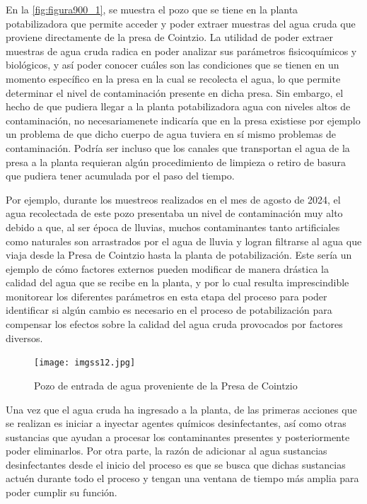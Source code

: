 En la \autoref{fig:figura900_1}, se muestra el pozo que se tiene en la planta potabilizadora que permite acceder y poder extraer muestras del agua cruda que proviene 
directamente de la presa de Cointzio. La utilidad de poder extraer muestras de agua cruda radica en poder analizar sus parámetros fisicoquímicos y biológicos, y así 
poder conocer cuáles son las condiciones que se tienen en un momento específico en la presa en la cual se recolecta el agua, lo que permite determinar el nivel de 
contaminación presente en dicha presa. Sin embargo, el hecho de que pudiera llegar a la planta potabilizadora agua con niveles altos de contaminación, 
no necesariamenete indicaría que en la presa existiese por ejemplo un problema de que dicho cuerpo de agua tuviera en sí mismo problemas de contaminación. Podría ser 
incluso que los canales que transportan el agua de la presa a la planta requieran algún procedimiento de limpieza o retiro de basura que pudiera tener acumulada por el paso del tiempo.

Por ejemplo, durante los muestreos realizados en el mes de agosto de 2024, el agua recolectada de este pozo presentaba un nivel de contaminación muy alto debido a que, al ser época de lluvias, muchos contaminantes tanto 
artificiales como naturales son arrastrados por el agua de lluvia y logran filtrarse al agua que viaja desde la Presa de Cointzio hasta la planta de potabilización. Este sería un ejemplo de cómo factores externos pueden 
modificar de manera drástica la calidad del agua que se recibe en la planta, y por lo cual resulta imprescindible monitorear los diferentes parámetros en esta etapa del proceso para poder identificar si algún cambio es necesario 
en el proceso de potabilización para compensar los efectos sobre la calidad del agua cruda provocados por factores diversos.  

\clearpage

\begin{figure}[h]
	\centering
	\texttt{[image: imgss12.jpg]}
	\caption{Pozo de entrada de agua proveniente de la Presa de Cointzio}
	\label{fig:figura900_1}
\end{figure}

Una vez que el agua cruda ha ingresado a la planta, de las primeras acciones que se realizan es iniciar a inyectar agentes químicos desinfectantes, así como otras sustancias que ayudan a procesar los contaminantes presentes y 
posteriormente poder eliminarlos. Por otra parte, la razón de adicionar al agua sustancias desinfectantes desde el inicio del proceso es que se busca que dichas sustancias actuén durante todo el proceso y tengan una ventana de 
tiempo más amplia para poder cumplir su función.

